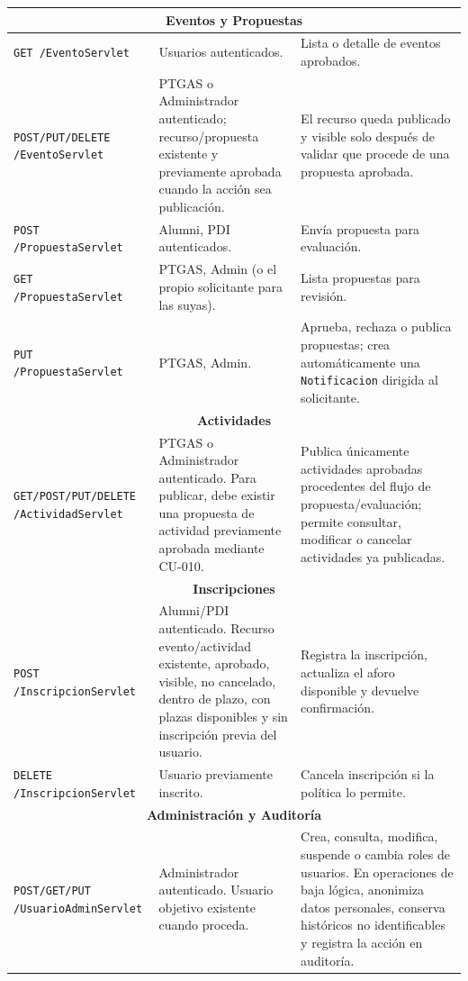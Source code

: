 \documentclass{report}
\begin{document}
\begin{longtable}{|p{}|p{}|p{}|}
\multicolumn{3}{|c|}{\textbf{Eventos y Propuestas}} \\ \hline
\texttt{GET /EventoServlet} & Usuarios autenticados. & Lista o detalle de eventos aprobados. \\ \hline
\texttt{POST/PUT/DELETE /EventoServlet} & PTGAS o Administrador autenticado; recurso/propuesta existente y previamente aprobada cuando la acción sea publicación. & El recurso queda publicado y visible solo después de validar que procede de una propuesta aprobada. \\ \hline
\texttt{POST /PropuestaServlet} & Alumni, PDI autenticados. & Envía propuesta para evaluación. \\ \hline
\texttt{GET /PropuestaServlet} & PTGAS, Admin (o el propio solicitante para las suyas). & Lista propuestas para revisión. \\ \hline
\texttt{PUT /PropuestaServlet} & PTGAS, Admin. & Aprueba, rechaza o publica propuestas; crea automáticamente una \texttt{Notificacion} dirigida al solicitante. \\ \hline
\multicolumn{3}{|c|}{\textbf{Actividades}} \\ \hline
\texttt{GET/POST/PUT/DELETE /ActividadServlet} & PTGAS o Administrador autenticado. Para publicar, debe existir una propuesta de actividad previamente aprobada mediante CU-010. & Publica únicamente actividades aprobadas procedentes del flujo de propuesta/evaluación; permite consultar, modificar o cancelar actividades ya publicadas. \\ \hline
\multicolumn{3}{|c|}{\textbf{Inscripciones}} \\ \hline
\texttt{POST /InscripcionServlet} & Alumni/PDI autenticado. Recurso evento/actividad existente, aprobado, visible, no cancelado, dentro de plazo, con plazas disponibles y sin inscripción previa del usuario. & Registra la inscripción, actualiza el aforo disponible y devuelve confirmación. \\ \hline
\texttt{DELETE /InscripcionServlet} & Usuario previamente inscrito. & Cancela inscripción si la política lo permite. \\ \hline
\multicolumn{3}{|c|}{\textbf{Administración y Auditoría}} \\ \hline
\texttt{POST/GET/PUT /UsuarioAdminServlet} & Administrador autenticado. Usuario objetivo existente cuando proceda. & Crea, consulta, modifica, suspende o cambia roles de usuarios. En operaciones de baja lógica, anonimiza datos personales, conserva históricos no identificables y registra la acción en auditoría. \\ \hline

\end{longtable}
\end{document}
